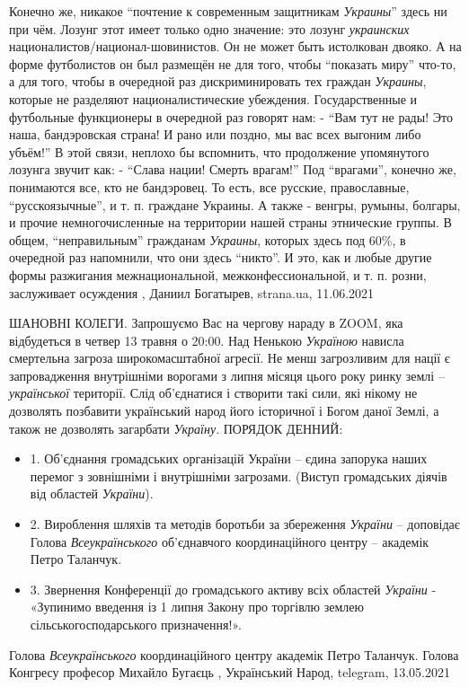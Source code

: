 Конечно же, никакое \enquote{почтение к современным защитникам \emph{Украины}} здесь ни при
чём. Лозунг этот имеет только одно значение: это лозунг \emph{украинских}
националистов/национал-шовинистов. Он не может быть истолкован двояко.  А на
форме футболистов он был размещён не для того, чтобы \enquote{показать миру} что-то, а
для того, чтобы в очередной раз дискриминировать тех граждан \emph{Украины}, которые
не разделяют националистические убеждения. Государственные и футбольные
функционеры в очередной раз говорят нам: - \enquote{Вам тут не рады! Это наша,
бандэровская страна! И рано или поздно, мы вас всех выгоним либо убъём!} В этой
связи, неплохо бы вспомнить, что продолжение упомянутого лозунга звучит как: -
\enquote{Слава нации! Смерть врагам!} Под \enquote{врагами}, конечно же, понимаются все, кто не
бандэровец. То есть, все русские, православные, \enquote{русскоязычные}, и т. п.
граждане Украины. А также - венгры, румыны, болгары, и прочие немногочисленные
на территории нашей страны этнические группы.  В общем, \enquote{неправильным}
гражданам \emph{Украины}, которых здесь под 60\%, в очередной раз напомнили, что они
здесь \enquote{никто}. И это, как и любые другие формы разжигания межнациональной,
межконфессиональной, и т. п. розни, заслуживает осуждения
, 
Даниил Богатырев, strana.ua, 11.06.2021

ШАНОВНІ КОЛЕГИ. Запрошуємо Вас на чергову нараду в ZOOM, яка відбудеться в
четвер 13 травня о 20:00. Над Ненькою \emph{Україною} нависла смертельна загроза
широкомасштабної агресії. Не менш загрозливим для нації є запровадження
внутрішніми ворогами з липня місяця цього року ринку землі – \emph{української}
території.  Слід об'єднатися і створити такі сили, які нікому не дозволять
позбавити український народ його історичної і Богом даної Землі, а також не
дозволять загарбати \emph{Україну}.
ПОРЯДОК  ДЕННИЙ:
\begin{itemize}
\item 1. Об'єднання громадських організацій України – єдина запорука наших
перемог з зовнішніми і внутрішніми загрозами.  (Виступ громадських діячів від
областей \emph{України}).
\item 2. Вироблення шляхів та методів боротьби за збереження \emph{України} – доповідає
Голова \emph{Всеукраїнського} об'єднавчого координаційного центру – академік Петро
Таланчук.
\item 3. Звернення Конференції до громадського активу  всіх областей \emph{України} -
«Зупинимо введення із 1 липня  Закону про торгівлю землею
сільськогосподарського призначення!».
\end{itemize}
Голова \emph{Всеукраїнського} координаційного центру академік Петро Таланчук. Голова Конгресу професор Михайло Бугаєць
, Український Народ, telegram, 13.05.2021


